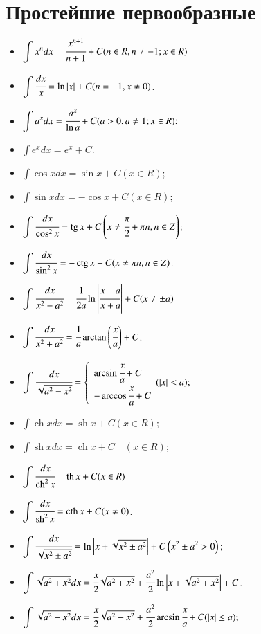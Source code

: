\documentclass[twoside, a4paperpt]{extarticle}
\begin{document}
\section*{Простейшие первообразные}

\begin{multicols}{2}
    \begin{itemize}
        \item $\displaystyle \int x^{n} d x=\cfrac{x^{n+1}}{n+1}+C(n \in R, n \neq-1 ; x \in R)$
        \item $\displaystyle \int \cfrac{d x}{x}=\ln |x|+C(n=-1, x \neq 0)$.
        \item $\displaystyle \int a^{x} d x=\cfrac{a^{x}}{\ln a}+C(a>0, a \neq 1 ; x \in R) ; $
        \item $\displaystyle \int e^{x} d x=e^{x}+C$.
        \item $\displaystyle \int \cos x d x=\sin x+C(x \in R)$;
        \item $\displaystyle \int \sin x d x=-\cos x+C(x \in R)$;
        \item $\displaystyle \int \cfrac{d x}{\cos ^{2} x}=\operatorname{tg} x+C\left(x \neq \cfrac{\pi}{2}+\pi n, n \in Z\right)$;
        \item $\displaystyle \int \cfrac{d x}{\sin ^{2} x}=-\operatorname{ctg} x+C(x \neq \pi n, n \in Z)$.
        \item $\displaystyle \int \cfrac{d x}{x^{2}-a^{2}}=\cfrac{1}{2 a} \ln \left|\cfrac{x-a}{x+a}\right|+C(x \neq \pm a)$
        \item $\displaystyle \int \cfrac{d x}{x^{2}+a^{2}}=\cfrac{1}{a} \arctan \left(\cfrac{x}{a}\right)+C$.
        \item $\displaystyle \int \cfrac{d x}{\sqrt{a^{2}-x^{2}}}=\left\{\begin{array}{l}\arcsin \cfrac{x}{a}+C \\ -\arccos \cfrac{x}{a}+C\end{array}(|x|<a) ;\right.$ 
        \item $\displaystyle \int \operatorname{ch} x d x=\operatorname{sh} x+C(x \in R) ; \quad$
        \item $\displaystyle \int \operatorname{sh} x d x=\operatorname{ch} x+C \quad(x \in R)$;
        \item $\displaystyle \int \cfrac{d x}{\operatorname{ch}^{2} x}=\operatorname{th} x+C(x \in R)$
        \item $\displaystyle \int \cfrac{d x}{\operatorname{sh}^{2} x}=\operatorname{cth} x+C(x \neq 0)$.
    \end{itemize}
\end{multicols}
\begin{itemize}
    \item $\displaystyle \int \cfrac{d x}{\sqrt{x^{2} \pm a^{2}}}=\ln \left|x+\sqrt{x^{2} \pm a^{2}}\right|+C\left(x^{2} \pm a^{2}>0\right) ;$
    \item $\displaystyle \int \sqrt{a^{2}+x^{2}} d x=\cfrac{x}{2} \sqrt{a^{2}+x^{2}}+\cfrac{a^{2}}{2} \ln \left|x+\sqrt{a^{2}+x^{2}}\right|+C$.
    \item $\displaystyle \int \sqrt{a^{2}-x^{2}} d x=\cfrac{x}{2} \sqrt{a^{2}-x^{2}}+\cfrac{a^{2}}{2} \arcsin \cfrac{x}{a}+C(|x| \leq a) ;$
\end{itemize}
\end{document}
